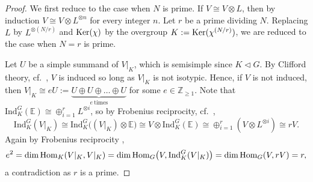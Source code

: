\documentclass[11pt]{amsart}
\theoremstyle{plain}
\theoremstyle{definition}
\numberwithin{thm}{section}
\numberwithin{equation}{thm}
\newcommand{\Hom}{{\rm Hom}}
\newcommand{\Ker}{{\rm Ker}}
\newcommand{\Ind}{\mathrm{Ind}}
\newcommand{\E}{{\mathbb E}}
\newcommand{\Z}{{\mathbb Z}}
\newcommand{\0}{\emptyset}
\begin{document}
\begin{proof}
We first reduce to the case when $N$ is prime. If $V \cong V\otimes L$, then by induction $V \cong V\otimes L^{\otimes n}$ for every integer $n$. Let $r$ be a prime dividing $N$. Replacing $L$ by $L^{\otimes (N/r)}$ and  $\Ker(\chi)$ by the overgroup 
$K:=\Ker(\chi^{(N/r)})$, we are reduced to the case when $N=r$ is prime.

Let $U$ be a simple summand of $V|_{K}$, which is semisimple since $K \lhd G$.  
By Clifford theory, cf.\ \cite[(50.5)]{C-R}, $V$ is induced so long as $V|_{K}$ is not isotypic. Hence, if $V$ is not induced, then
$V|_{K} \cong eU:= \underbrace{U \oplus U \oplus \ldots \oplus U}_{e \mathrm{~times}}$ for some $e \in \Z_{\geq 1}$.
Note that $\Ind^G_K(\E) \cong \oplus^{r}_{i=1}L^{\otimes i}$, so by Frobenius reciprocity, cf.\ \cite[(10.20)]{CR2},
$$\Ind^G_K(V|_K) \cong \Ind^G_K\bigl((V|_K) \otimes \E\bigr) \cong V \otimes \Ind^G_K(\E) \cong \oplus^r_{i=1}(V \otimes L^{\otimes i}) \cong rV.$$ 
Again by Frobenius reciprocity \cite[(10.8)]{CR2},
$$e^2=\dim \Hom_K(V|_K,V|_K) = \dim \Hom_G\bigl(V,\Ind^G_{K}(V|_K)\bigr) = \dim \Hom_G(V,rV) =r,$$
a contradiction as $r$ is a prime.
\end{proof}
\end{document}
